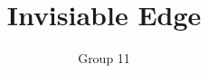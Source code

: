\documentclass[]{article}
\title{Invisiable Edge}
\author{Group 11}
\begin{document}
\maketitle

\listoftodos



\end{document}
